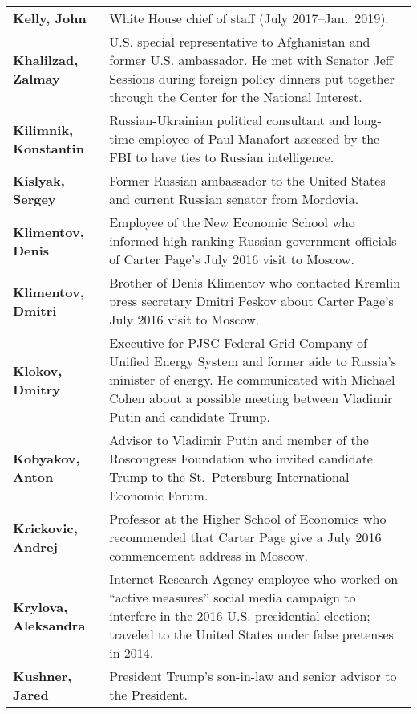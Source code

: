 \begin{longtable}{ p{} p{} }
    \textbf{Kelly, John} & White House chief of staff (July 2017--Jan.~2019). \\

    \textbf{Khalilzad, Zalmay} & U.S. special representative to Afghanistan and former U.S. ambassador. He met with Senator Jeff Sessions during foreign policy dinners put together through the Center for the National Interest. \\

    \textbf{Kilimnik, Konstantin} & Russian-Ukrainian political consultant and long-time employee of Paul Manafort assessed by the FBI to have ties to Russian intelligence. \\

    \textbf{Kislyak, Sergey} & Former Russian ambassador to the United States and current Russian senator from Mordovia. \\

    \textbf{Klimentov, Denis} & Employee of the New Economic School who informed high-ranking Russian government officials of Carter Page's July 2016 visit to Moscow. \\

    \textbf{Klimentov, Dmitri} & Brother of Denis Klimentov who contacted Kremlin press secretary Dmitri Peskov about Carter Page's July 2016 visit to Moscow. \\

    \textbf{Klokov, Dmitry} & Executive for PJSC Federal Grid Company of Unified Energy System and former aide to Russia's minister of energy. He communicated with Michael Cohen about a possible meeting between Vladimir Putin and candidate Trump. \\

    \textbf{Kobyakov, Anton} & Advisor to Vladimir Putin and member of the Roscongress Foundation who invited candidate Trump to the St.~Petersburg International Economic Forum. \\

    \textbf{Krickovic, Andrej} & Professor at the Higher School of Economics who recommended that Carter Page give a July 2016 commencement address in Moscow. \\

    \textbf{Krylova, Aleksandra} & Internet Research Agency employee who worked on ``active measures'' social media campaign to interfere in the 2016 U.S. presidential election; traveled to the United States under false pretenses in 2014. \\

    \textbf{Kushner, Jared} & President Trump's son-in-law and senior advisor to the President. \\


\end{longtable}
